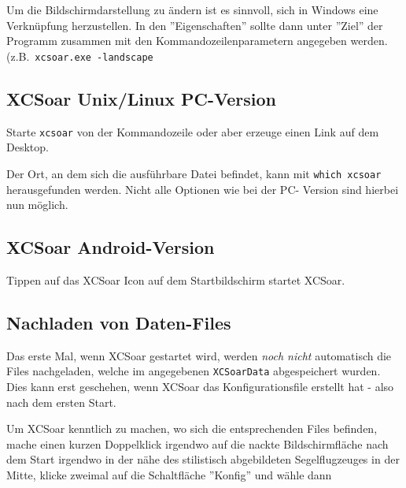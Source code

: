 Um die Bildschirmdarstellung zu ändern ist es sinnvoll, sich in Windows eine Verknüpfung herzustellen. 
In den ''Eigenschaften'' sollte dann unter ''Ziel'' der Programm zusammen mit den Kommandozeilenparametern 
angegeben werden. (z.B.\ \texttt{xcsoar.exe -landscape}


\subsection*{{\textsf  XCSoar} Unix/Linux PC-Version}
Starte \verb|xcsoar| von der Kommandozeile oder aber erzeuge einen Link auf dem Desktop. 

Der Ort, an dem sich die ausführbare Datei befindet,  kann mit \verb|which xcsoar| herausgefunden werden.
Nicht alle Optionen wie bei der PC- Version sind hierbei nun möglich.

\subsection*{{\textsf  XCSoar} Android-Version}
Tippen auf das {\textsf  XCSoar} Icon auf dem Startbildschirm startet {\textsf  XCSoar}. 

 
\subsection*{Nachladen von Daten-Files}
Das erste Mal, wenn {\textsf  XCSoar} gestartet wird, werden {\sl noch nicht} automatisch die Files nachgeladen, welche im 
angegebenen \verb|XCSoarData| abgespeichert wurden. Dies kann erst geschehen, wenn {\textsf  XCSoar} das Konfigurationsfile erstellt hat - also nach dem ersten Start.


Um {\textsf  XCSoar} kenntlich zu machen, wo sich die entsprechenden Files befinden, mache einen kurzen Doppelklick irgendwo auf die nackte Bildschirmfläche 
 nach dem Start irgendwo in der nähe des stilistisch abgebildeten Segelflugzeuges in der Mitte, klicke zweimal auf die Schaltfläche ''Konfig'' 
und wähle dann 
\begin{center}
~\blink~~\blink~ 
\end{center}

